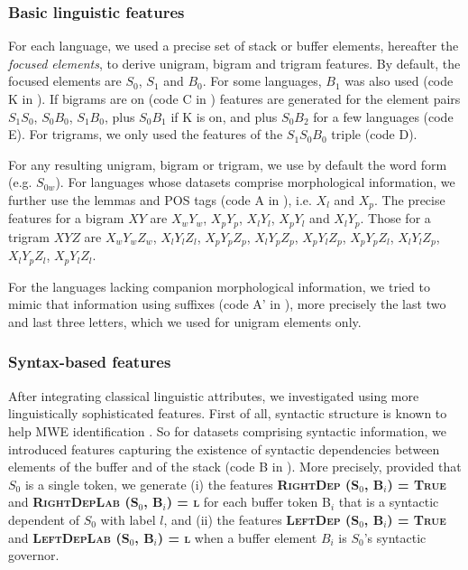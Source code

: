 \documentclass[output=paper,modfonts]{langscibook}
\begin{document}
\subsubsection*{Basic linguistic features}
For each language, we used a precise set of stack or buffer elements, hereafter the {\em focused elements}, to derive unigram, bigram and trigram features. By default, the focused elements are $S_0$, $S_1$ and $B_0$. For some languages, $B_1$ was also used (code K in ). If bigrams are on (code C in ) features are generated for the element pairs $S_1 S_0$, $S_0B_0$, $S_1B_0$, plus $S_0B_1$ if K is on, and plus $S_0B_2$ for a few languages (code E). For trigrams, we only used the features of the $S_1S_0B_0$ triple (code D).

For any resulting unigram, bigram or trigram, we use by default the word form (e.g. $S_{0w}$). For languages whose datasets comprise morphological information, we further use the lemmas and POS tags (code A in ), i.e. $X_l$ and $X_p$. The precise features for a bigram $XY$ are $X_wY_w$, $X_pY_p$, $X_lY_l$, $X_pY_l$ and $X_lY_p$. Those for a trigram $XYZ$ are $X_wY_wZ_w$, $X_lY_lZ_l$, $X_pY_pZ_p$, $X_lY_pZ_p$, $X_pY_lZ_p$, $X_pY_pZ_l$, $X_lY_lZ_p$, $X_lY_pZ_l$, $X_pY_lZ_l$.

For the languages lacking companion morphological information, we tried to mimic that information using suffixes (code A' in ), more precisely the last two and last three letters, which we used for unigram elements only.
\subsubsection*{Syntax-based features}
After integrating classical linguistic attributes, we investigated using more linguistically sophisticated features. First of all, syntactic structure is known to help MWE identification \citep{fazly-cook-stevenson:2009:CL,seretan2011syntax,nagyt-vincze:2014:MWE}. So for datasets comprising syntactic information, we introduced features capturing the existence of syntactic dependencies between elements of the buffer and of the stack (code B in ).  More precisely, provided that $S_0$ is a single token, we generate (i) the features \textbf{\textsc{RightDep (S$_0$, B$_i$) = True}} and \textbf{\textsc{RightDepLab (S$_0$, B$_i$) = l}} for each buffer token B$_i$ that is a syntactic dependent of $S_0$ with label $l$, and (ii) the features \textbf{\textsc{LeftDep (S$_0$, B$_i$) = True}} and \textbf{\textsc{LeftDepLab (S$_0$, B$_i$) = l}} when a buffer element $B_i$ is $S_0$'s syntactic governor.
\end{document}
